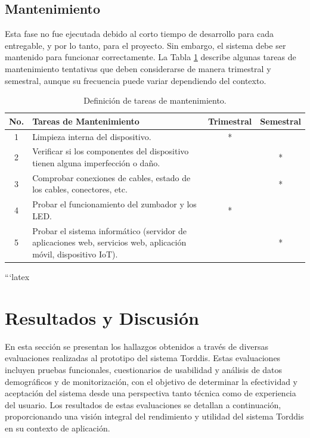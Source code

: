 \documentclass[a4paper,fleqn]{cas-sc}
\begin{document}
	\subsection{Mantenimiento}
	Esta fase no fue ejecutada debido al corto tiempo de desarrollo para cada entregable, y por lo tanto, para el proyecto. Sin embargo, el sistema debe ser mantenido para funcionar correctamente. La Tabla \ref{tab:maintenance-tasks} describe algunas tareas de mantenimiento tentativas que deben considerarse de manera trimestral y semestral, aunque su frecuencia puede variar dependiendo del contexto.
	
	\begin{table}[hbt!]
		\centering
		\caption{Definición de tareas de mantenimiento.}
		\label{tab:maintenance-tasks}
		\begin{tabularx}{\textwidth}{cXcc}
			\toprule
			\textbf{No.} & \textbf{Tareas de Mantenimiento} & \textbf{Trimestral} & \textbf{Semestral} \\
			\midrule
			1 & Limpieza interna del dispositivo. & * & \\
			2 & Verificar si los componentes del dispositivo tienen alguna imperfección o daño. & & * \\
			3 & Comprobar conexiones de cables, estado de los cables, conectores, etc. & & * \\
			4 & Probar el funcionamiento del zumbador y los LED. & * & \\
			5 & Probar el sistema informático (servidor de aplicaciones web, servicios web, aplicación móvil, dispositivo IoT). & & * \\
			\bottomrule
		\end{tabularx}
	\end{table}
	
	```latex
	\section{Resultados y Discusión}
	\label{seccion:Cinco}
	En esta sección se presentan los hallazgos obtenidos a través de diversas evaluaciones realizadas al prototipo del sistema Torddis. Estas evaluaciones incluyen pruebas funcionales, cuestionarios de usabilidad y análisis de datos demográficos y de monitorización, con el objetivo de determinar la efectividad y aceptación del sistema desde una perspectiva tanto técnica como de experiencia del usuario. Los resultados de estas evaluaciones se detallan a continuación, proporcionando una visión integral del rendimiento y utilidad del sistema Torddis en su contexto de aplicación.
	
\end{document}
